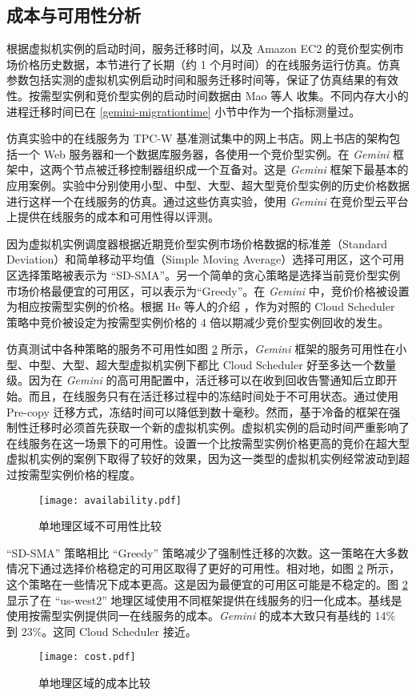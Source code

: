 \subsection{成本与可用性分析}
根据虚拟机实例的启动时间，服务迁移时间，以及 Amazon EC2 的竞价型实例市场价格历史数据，本节进行了长期（约 1 个月时间）的在线服务运行仿真。仿真参数包括实测的虚拟机实例启动时间和服务迁移时间等，保证了仿真结果的有效性。按需型实例和竞价型实例的启动时间数据由 Mao 等人 \cite{Mao:2012:PSV:2353730.2353859} 收集。不同内存大小的进程迁移时间已在 \ref{gemini-migrationtime} 小节中作为一个指标测量过。

仿真实验中的在线服务为 TPC-W 基准测试集中的网上书店。网上书店的架构包括一个 Web 服务器和一个数据库服务器，各使用一个竞价型实例。在 \emph{Gemini} 框架中，这两个节点被迁移控制器组织成一个互备对。这是 \emph{Gemini} 框架下最基本的应用案例。实验中分别使用小型、中型、大型、超大型竞价型实例的历史价格数据进行这样一个在线服务的仿真。通过这些仿真实验，使用 \emph{Gemini} 在竞价型云平台上提供在线服务的成本和可用性得以评测。

因为虚拟机实例调度器根据近期竞价型实例市场价格数据的标准差（Standard Deviation）和简单移动平均值（Simple Moving Average）选择可用区，这个可用区选择策略被表示为 ``SD-SMA''。另一个简单的贪心策略是选择当前竞价型实例市场价格最便宜的可用区，可以表示为``Greedy''。在 \emph{Gemini} 中，竞价价格被设置为相应按需型实例的价格。根据 He 等人的介绍 \cite{He:2015:CCH:2749246.2749275}，作为对照的 Cloud Scheduler 策略中竞价被设定为按需型实例价格的 4 倍以期减少竞价型实例回收的发生。

仿真测试中各种策略的服务不可用性如图 \ref{figure:cost} 所示，\emph{Gemini} 框架的服务可用性在小型、中型、大型、超大型虚拟机实例下都比 Cloud Scheduler 好至多达一个数量级。因为在 \emph{Gemini} 的高可用配置中，活迁移可以在收到回收告警通知后立即开始。而且，在线服务只有在活迁移过程中的冻结时间处于不可用状态。通过使用 Pre-copy 迁移方式，冻结时间可以降低到数十毫秒。然而，基于冷备的框架在强制性迁移时必须首先获取一个新的虚拟机实例。虚拟机实例的启动时间严重影响了在线服务在这一场景下的可用性。设置一个比按需型实例价格更高的竞价在超大型虚拟机实例的案例下取得了较好的效果，因为这一类型的虚拟机实例经常波动到超过按需型实例价格的程度。
\begin{figure}[]
  \centering
  \texttt{[image: availability.pdf]}
  \caption{单地理区域不可用性比较}
  \label{figure:unavailability}
\end{figure}

``SD-SMA'' 策略相比 ``Greedy'' 策略减少了强制性迁移的次数。这一策略在大多数情况下通过选择价格稳定的可用区取得了更好的可用性。相对地，如图 \ref{figure:cost} 所示，这个策略在一些情况下成本更高。这是因为最便宜的可用区可能是不稳定的。图 \ref{figure:cost} 显示了在 ``us-west2'' 地理区域使用不同框架提供在线服务的归一化成本。基线是使用按需型实例提供同一在线服务的成本。\emph{Gemini} 的成本大致只有基线的 14\% 到 23\%。这同 Cloud Scheduler 接近。
\begin{figure}[]
  \centering
  \texttt{[image: cost.pdf]}
  \caption{单地理区域的成本比较}
  \label{figure:cost}
\end{figure}


